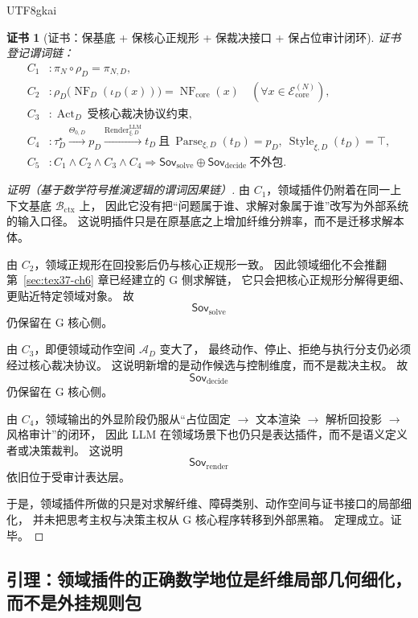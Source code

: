 \documentclass[12pt]{article}
\newtheorem{Certificate}{证书}[section]
\newcommand{\Parse}{\operatorname{Parse}}
\newcommand{\Render}{\operatorname{Render}}
\newcommand{\Style}{\operatorname{Style}}
\begin{document}
\begin{CJK*}{UTF8}{gkai}
\begin{Certificate}[证书：保基底 + 保核心正规形 + 保裁决接口 + 保占位审计闭环]
\label{cert:tex37-ch7-conservative}
证书登记谓词链：
\[
\begin{aligned}
  C_1 &: \pi_N\circ \rho_D=\pi_{N,D},\\
  C_2 &: \rho_D\bigl(\operatorname{NF}_D(\iota_D(x))\bigr)=\operatorname{NF}_{\mathrm{core}}(x)\quad (\forall
    x\in\mathcal E_{\mathrm{core}}^{(N)}),\\
  C_3 &: \operatorname{Act}_D\ \text{受核心裁决协议约束},\\
  C_4 &: \tau_D^\star\xrightarrow{\Theta_{0,D}}p_D\xrightarrow{\Render^{\mathrm{LLM}}_{\xi,D}}t_D\
  \text{且}\ \Parse_{\xi,D}(t_D)=p_D,\ \Style_{\xi,D}(t_D)=\top,\\
  C_5 &: C_1\wedge C_2\wedge C_3\wedge C_4
  \Rightarrow
  \mathsf{Sov}_{\mathrm{solve}}\oplus \mathsf{Sov}_{\mathrm{decide}}\ \text{不外包}.
\end{aligned}
\]
\end{Certificate}

\begin{proof}[证明（基于数学符号推演逻辑的谓词因果链）]
由 $C_1$，领域插件仍附着在同一上下文基底 $\mathcal B_{\mathrm{ctx}}$ 上，
因此它没有把“问题属于谁、求解对象属于谁”改写为外部系统的输入口径。
这说明插件只是在原基底之上增加纤维分辨率，而不是迁移求解本体。

由 $C_2$，领域正规形在回投影后仍与核心正规形一致。
因此领域细化不会推翻第~\ref{sec:tex37-ch6} 章已经建立的 G 侧求解链，
它只会把核心正规形分解得更细、更贴近特定领域对象。
故
\[
  \mathsf{Sov}_{\mathrm{solve}}
\]
仍保留在 G 核心侧。

由 $C_3$，即便领域动作空间 $\mathcal A_D$ 变大了，
最终动作、停止、拒绝与执行分支仍必须经过核心裁决协议。
这说明新增的是动作候选与控制维度，而不是裁决主权。
故
\[
  \mathsf{Sov}_{\mathrm{decide}}
\]
仍保留在 G 核心侧。

由 $C_4$，领域输出的外显阶段仍服从“占位固定 $\rightarrow$ 文本渲染 $\rightarrow$ 解析回投影 $\rightarrow$ 风格审计”的闭环，
因此 LLM 在领域场景下也仍只是表达插件，而不是语义定义者或决策裁判。
这说明
\[
  \mathsf{Sov}_{\mathrm{render}}
\]
依旧位于受审计表达层。

于是，领域插件所做的只是对求解纤维、障碍类别、动作空间与证书接口的局部细化，
并未把思考主权与决策主权从 G 核心程序转移到外部黑箱。
定理成立。证毕。
\end{proof}

\subsection{引理：领域插件的正确数学地位是纤维局部几何细化，而不是外挂规则包}
\label{subsec:tex37-ch7-lemma}


\end{CJK*}
\end{document}
